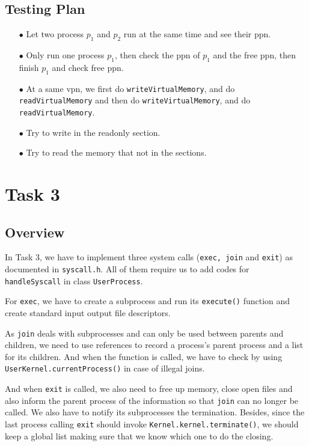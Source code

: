 \documentclass{article}
\begin{document}
\begin{spacing}{1.1}
\subsection{Testing Plan}
\begin{enumerate}
  \item[$\bullet$] Let two process $p_1$ and $p_2$ run at the same time and see
    their ppn.
  \item[$\bullet$] Only run one process $p_1$, then check the ppn of $p_1$
    and the free ppn, then finish $p_1$ and check free ppn.
  \item[$\bullet$] At a same vpn, we first do \texttt{writeVirtualMemory},
    and do \texttt{readVirtualMemory} and then do \texttt{writeVirtualMemory},
    and do \texttt{readVirtualMemory}.
  \item[$\bullet$] Try to write in the readonly section.
  \item[$\bullet$] Try to read the memory that not in the sections.
\end{enumerate}



\section{Task 3}
\subsection{Overview}
In Task 3, we have to implement three system calls (\texttt{exec, join} and \texttt{exit}) as documented in \texttt{syscall.h}. All of them require us to add codes for \texttt{handleSyscall} in class \texttt{UserProcess}.

For \texttt{exec}, we have to create a subprocess and run its \texttt{execute()} function and create standard input output file descriptors.

As \texttt{join} deals with subprocesses and can only be used between parents and children, we need to use references to record a process's parent process and a list for its children. And when the function is called, we have to check by using \texttt{UserKernel.currentProcess()} in case of illegal joins.

And when \texttt{exit} is called, we also need to free up memory, close open files and also inform the parent process of the information so that \texttt{join} can no longer be called. We also have to notify its subprocesses the termination. Besides, since the last process calling \texttt{exit} should invoke \texttt{Kernel.kernel.terminate()}, we should keep a global list making sure that we know which one to do the closing.


\end{spacing}
\end{document}
